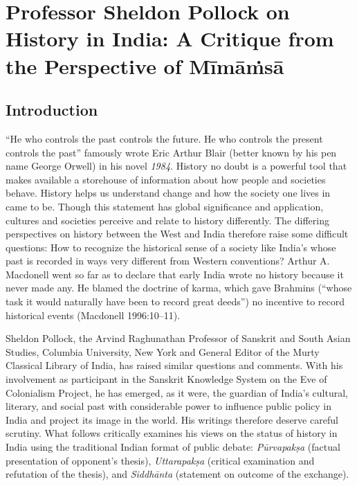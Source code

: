 
\chapter{Professor Sheldon Pollock on History in India: A Critique from the Perspective of Mīmāṁsā}



\section*{Introduction}

“He who controls the past controls the future. He who controls the present controls the past” famously wrote Eric Arthur Blair (better known by his pen name George Orwell) in his novel \textit{1984}. History no doubt is a powerful tool that makes available a storehouse of information about how people and societies behave. History helps us understand change and how the society one lives in came to be. Though this statement has global significance and application, cultures and societies perceive and relate to history differently. The differing perspectives on history between the West and India therefore raise some difficult questions: How to recognize the historical sense of a society like India’s whose past is recorded in ways very different from Western conventions? Arthur A. Macdonell went so far as to declare that early India wrote no history because it never made any. He blamed the doctrine of karma, which gave Brahmins (“whose task it would naturally have been to record great deeds”) no incentive to record historical events (Macdonell 1996:10–11).

\newpage

Sheldon Pollock, the Arvind Raghunathan Professor of Sanskrit and South Asian Studies, Columbia University, New York and General Editor of the Murty Classical Library of India, has raised similar questions and comments. With his involvement as participant in the Sanskrit Knowledge System on the Eve of Colonialism Project, he has emerged, as it were, the guardian of India’s cultural, literary, and social past with considerable power to influence public policy in India and project its image in the world. His writings therefore deserve careful scrutiny. What follows critically examines his views on the status of history in India using the traditional Indian format of public debate: \textit{Pūrvapakṣa} (factual presentation of opponent’s thesis), \textit{Uttarapakṣa} (critical examination and refutation of the thesis), and \textit{Siddhānta} (statement on outcome of the exchange).


